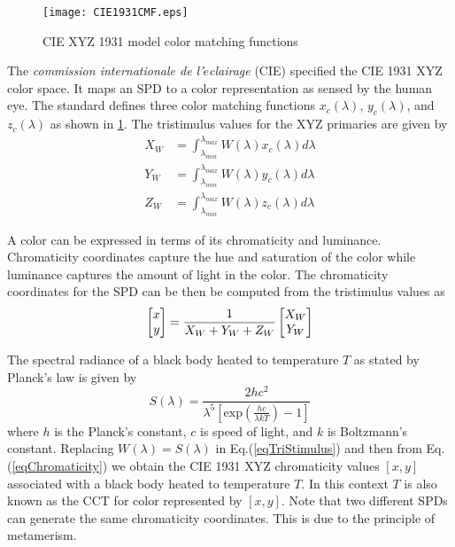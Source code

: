 \begin{figure}[!b]
	\centering
		\texttt{[image: CIE1931CMF.eps]}
	\caption{CIE XYZ 1931 model color matching functions}
	\label{fig:CIE1931CMF}
\end{figure}

The \textit{commission internationale de l'$\acute{e}$clairage} (CIE) specified the CIE 1931 XYZ color space. It maps an SPD to a color representation as sensed by the human eye. The standard defines three color matching functions $x_c(\lambda)$, $y_c(\lambda)$, and $z_c(\lambda)$ as shown in \figurename{ \ref{fig:CIE1931CMF}}. The tristimulus values for the XYZ primaries are given by
\setlength{\arraycolsep}{0.0em}
\begin{subequations}
\begin{align}
X_W &= \int_{\lambda_{min}}^{\lambda_{max}}W(\lambda)x_c(\lambda)d\lambda\\
Y_W &= \int_{\lambda_{min}}^{\lambda_{max}}W(\lambda)y_c(\lambda)d\lambda\\
Z_W &= \int_{\lambda_{min}}^{\lambda_{max}}W(\lambda)z_c(\lambda)d\lambda
\end{align}
\label{eqTriStimulus}
\end{subequations}
\setlength{\arraycolsep}{5pt}

A color can be expressed in terms of its chromaticity and luminance. Chromaticity coordinates capture the hue and saturation of the color while luminance captures the amount of light in the color. The chromaticity coordinates for the SPD can be then be computed from the tristimulus values as
\begin{equation}
\label{eqChromaticity}
	\left[ \begin{matrix} x\\ y \end{matrix} \right] = \frac{1}{X_W+Y_W+Z_W}\left[ \begin{matrix} X_W\\ Y_W \end{matrix} \right]
\end{equation}

The spectral radiance of a black body heated to temperature $T$ as stated by Planck's law is given by
\begin{equation}
\label{eqPlanck}
	 S(\lambda) = \frac{2hc^2}{\lambda^5\left[\text{exp}\left(\frac{hc}{\lambda kT}\right)-1\right]}
\end{equation}
where $h$ is the Planck's constant, $c$ is speed of light, and $k$ is Boltzmann's constant. Replacing $W(\lambda)=S(\lambda)$ in Eq.(\ref{eqTriStimulus}) and then from Eq.(\ref{eqChromaticity}) we obtain the CIE 1931 XYZ chromaticity values $[x,y]$ associated with a black body heated to temperature $T$. In this context $T$ is also known as the CCT for color represented by $[x,y]$. Note that two different SPDs can generate the same chromaticity coordinates. This is due to the principle of metamerism.

